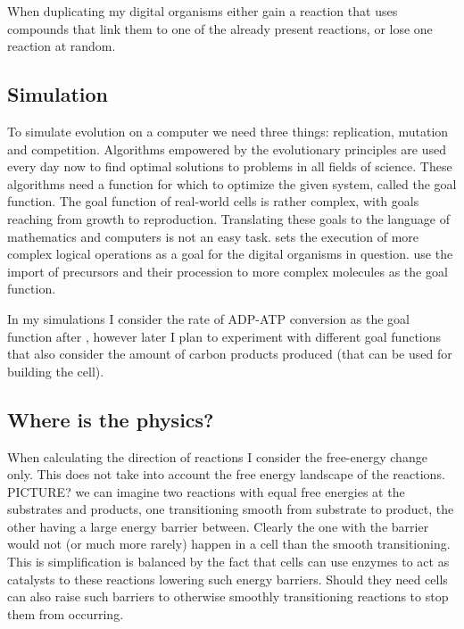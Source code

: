\documentclass[10pt,a4paper]{article}
\begin{document}
	When duplicating my digital organisms either gain a reaction that uses compounds that link them to one of the already present reactions, or lose one reaction at random. 
	
	\subsection{Simulation}
	
	To simulate evolution on a computer we need three things: replication, mutation and competition. Algorithms empowered by the evolutionary principles \cite{evolutionaryalgorithms} are used every day now to find optimal solutions to problems in all fields of science. These algorithms need a function for which to optimize the given system, called the goal function. The goal function of real-world cells is rather complex, with goals reaching from growth to reproduction. Translating these goals to the language of mathematics and computers is not an easy task. \citeauthor{complexfeatures} sets the execution of more complex logical operations as a goal for the digital organisms in question. \citeauthor{evolutioncomplex} use the import of precursors and their procession to more complex molecules as the goal function. 
	
	In my simulations I consider the rate of ADP-ATP conversion as the goal function after \citeauthor{BartekLower}, however later I plan to experiment with different goal functions that also consider the amount of carbon products produced (that can be used for building the cell). 
	
	\subsection{Where is the physics?}\label{chap:whereisphysics}
	
	When calculating the direction of reactions I consider the free-energy change only. This does not take into account the free energy landscape of the reactions. PICTURE? we can imagine two reactions with equal free energies at the substrates and products, one transitioning smooth from substrate to product, the other having a large energy barrier between. Clearly the one with the barrier would not (or much more rarely) happen in a cell than the smooth transitioning. This is simplification is balanced by the fact that cells can use enzymes to act as catalysts to these reactions lowering such energy barriers. Should they need cells can also raise such barriers to otherwise smoothly transitioning reactions to stop them from occurring. 
	
\end{document}
